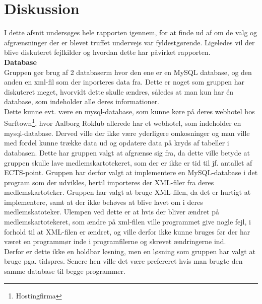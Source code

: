 
\chapter{Diskussion}
\label{sec:Diskussion}

I dette afsnit undersøges hele rapporten igennem, for at finde ud af om de valg og afgrænsninger der er blevet truffet undervejs var fyldestgørende. Ligeledes vil der blive diskuteret fejlkilder og hvordan dette har påvirket rapporten.\\

\textbf{Database}\\
Gruppen gør brug af 2 databaserm hvor den ene er en MySQL database, og den anden en xml-fil som der inporteres data fra.
Dette er noget som gruppen har diskuteret meget, hvorvidt dette skulle ændres, således at man kun har én database, som indeholder alle deres informationer.\\

Dette kunne evt. være en mysql-database, som kunne køre på deres webhotel hos Surftown\footnote{Hostingfirma}, hvor Aalborg Roklub allerede har et webhotel, som indeholder en mysql-database.
Derved ville der ikke være yderligere omkosninger og man ville med fordel kunne trække data ud og opdatere data på kryds af tabeller i databasen. Dette har gruppen valgt at afgrænse sig fra, da dette ville betyde at gruppen skulle lave medlemskartotekeret, som der er ikke er tid til jf. antallet af ECTS-point. Gruppen har derfor valgt at implementere en MySQL-database i det program som der udvikles, hertil importeres der XML-filer fra deres medlemskartoteker. Gruppen har valgt at bruge XML-filen, da det er hurtigt at implementere, samt at der ikke behøves at blive lavet om i deres medlemskatoteker. Ulempen ved dette er at hvis der bliver ændret på medlemskartotekeret, som ændre på xml-filen ville programmet give nogle fejl, i forhold til at XML-filen er ændret, og ville derfor ikke kunne bruges før der har været en programmør inde i programfilerne og skrevet ændringerne ind.\\

Derfor er dette ikke en holdbar løsning, men en løsning som gruppen har valgt at bruge pga. tidspres. Senere hen ville det være prefereret hvis man brugte den samme database til begge programmer.\\

